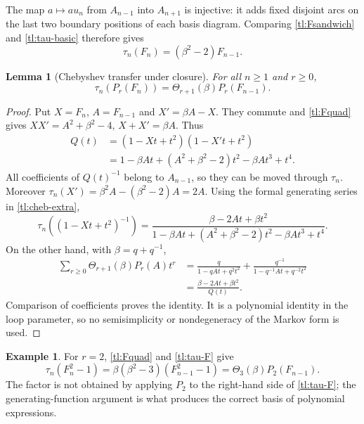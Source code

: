 \documentclass[a4paper,11pt,oneside,reqno]{amsart}
\newtheorem{lemma}[theorem]{Lemma}
\theoremstyle{definition}
\newtheorem{example}[theorem]{Example}
\numberwithin{equation}{section}
\begin{document}
	The map $a\mapsto au_n$ from $A_{n-1}$ into $A_{n+1}$ is injective:
	it adds fixed disjoint arcs on the last two boundary positions of
	each basis diagram.  Comparing \eqref{tl:Fsandwich} and
	\eqref{tl:tau-basic} therefore gives
	\begin{equation}\label{tl:tau-F}
		\tau_n(F_n)=(\beta^2-2)F_{n-1}.
	\end{equation}
	
	\begin{lemma}[Chebyshev transfer under closure]\label{tl:cheb-transfer}
		For all $n\ge1$ and $r\ge0$,
		\begin{equation}\label{tl:tau-P}
			\boxed{\tau_n(P_r(F_n))=\Theta_{r+1}(\beta)P_r(F_{n-1}).}
		\end{equation}
	\end{lemma}
	\begin{proof}
		Put $X=F_n$, $A=F_{n-1}$ and $X'=\beta A-X$.  They commute and
		\eqref{tl:Fquad} gives
		$XX'=A^2+\beta^2-4$, $X+X'=\beta A$.
		Thus
		\[
		\begin{aligned}
			Q(t)&=(1-Xt+t^2)(1-X't+t^2)\\
			&=1-\beta At+(A^2+\beta^2-2)t^2-\beta At^3+t^4.
		\end{aligned}
		\]
		All coefficients of $Q(t)^{-1}$ belong to $A_{n-1}$, so they can
		be moved through $\tau_n$.  Moreover
		$\tau_n(X')=\beta^2 A-(\beta^2-2)A=2A$.
		Using the formal generating series in \eqref{tl:cheb-extra},
		\begin{equation}\label{tl:trace-generating}
			\tau_n((1-Xt+t^2)^{-1})
			=\frac{\beta-2At+\beta t^2}
			{1-\beta At+(A^2+\beta^2-2)t^2-\beta At^3+t^4}.
		\end{equation}
		On the other hand, with $\beta=q+q^{-1}$,
		\[
		\begin{aligned}
			\sum_{r\ge0}\Theta_{r+1}(\beta)P_r(A)t^r
			&=\frac q{1-qAt+q^2t^2}
			+\frac{q^{-1}}{1-q^{-1}At+q^{-2}t^2}\\
			&=\frac{\beta-2At+\beta t^2}{Q(t)}.
		\end{aligned}
		\]
		Comparison of coefficients proves the identity.  It is a polynomial
		identity in the loop parameter, so no semisimplicity or nondegeneracy
		of the Markov form is used.
	\end{proof}
	
	\begin{example}
		For $r=2$, \eqref{tl:Fquad} and \eqref{tl:tau-F} give
		\[
		\tau_n(F_n^2-1)=\beta(\beta^2-3)(F_{n-1}^2-1)
		=\Theta_3(\beta)P_2(F_{n-1}).
		\]
		The factor is not obtained by applying $P_2$ to the right-hand side
		of \eqref{tl:tau-F}; the generating-function argument is what
		produces the correct basis of polynomial expressions.
	\end{example}
	
\end{document}
